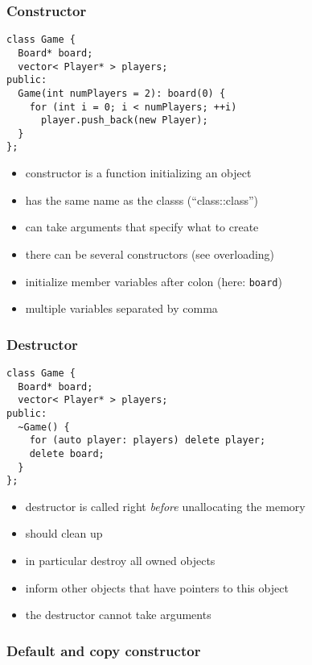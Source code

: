 \documentclass{slides}
\begin{document}
\begin{frame}[fragile]
  \frametitle{Constructor}

\begin{lstlisting}
class Game {
  Board* board;
  vector< Player* > players;
public:
  Game(int numPlayers = 2): board(0) {
    for (int i = 0; i < numPlayers; ++i)
      player.push_back(new Player);
  }
};
\end{lstlisting}

  \begin{itemize}
  \item constructor is a function initializing an object
  \item has the same name as the classs (``class::class'')
  \item can take arguments that specify what to create
  \item there can be several constructors (see overloading)
  \item initialize member variables after colon (here: \lstinline!board!)
  \item multiple variables separated by comma
  \end{itemize}
\end{frame}

\begin{frame}[fragile]
  \frametitle{Destructor}

\begin{lstlisting}
class Game {
  Board* board;
  vector< Player* > players;
public:
  ~Game() {
    for (auto player: players) delete player;
    delete board;
  }
};
\end{lstlisting}

  \begin{itemize}
  \item destructor is called right \emph{before} unallocating the
    memory
  \item should clean up
  \item in particular destroy all owned objects
  \item inform other objects that have pointers to this object
  \item the destructor cannot take arguments
  \end{itemize}
\end{frame}

\begin{frame}
  \frametitle{Default and copy constructor}



\end{frame}
\end{document}
